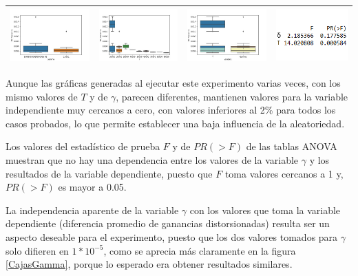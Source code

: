 \begin{table}[h]
\begin{tabular}[c]{llll}
\multicolumn{1}{|l|}{\includegraphics[align=t, width=33mm]{cajasGamma_exp43.jpg}}    & \multicolumn{1}{l|}{\includegraphics[align=t, width=33mm]{cajasT_exp43.jpg} } & \multicolumn{1}{l|}{\includegraphics[align=t, width=33mm]{cajasT_Gamma_exp43.jpg} } & \multicolumn{1}{p{3.2cm}|}{\includegraphics[align=t, width=30mm]{Anova43.png}} \\ \hline
\end{tabular}
\label{exp4}
\end{table}

Aunque las gráficas generadas al ejecutar este experimento varias veces, con los mismo valores de $T$ y de $\gamma$, parecen diferentes, mantienen valores para la variable independiente muy cercanos a cero, con valores inferiores al 2\% para todos los casos probados, lo que permite establecer una baja influencia de la aleatoriedad.

Los  valores del estadístico de prueba $F$ y de $PR(>F)$ de las tablas ANOVA muestran que no hay una dependencia entre los valores de la variable $\gamma$ y los resultados de la variable dependiente, puesto que $F$ toma valores cercanos a 1 y, $PR(>F)$ es mayor a 0.05. 

La independencia aparente de la variable $\gamma$ con los valores que toma la variable dependiente (diferencia promedio de ganancias distorsionadas) resulta ser un aspecto deseable para el experimento, puesto que los dos valores tomados para $\gamma$ solo difieren en $1*10^{-5}$, como se aprecia más claramente en la figura \ref{CajasGamma}, porque lo esperado era obtener resultados similares. 

